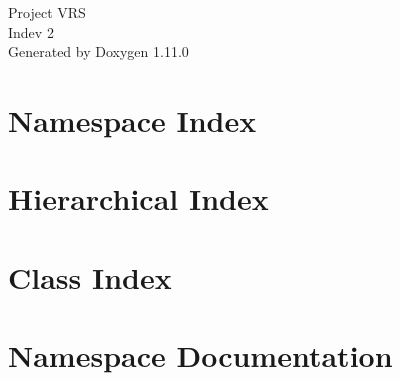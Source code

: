 \documentclass[twoside]{book}
\newcommand{\+}{\discretionary{\mbox{\scriptsize$\hookleftarrow$}}{}{}}
\newcommand{\clearemptydoublepage}{%
    \newpage{\pagestyle{empty}\cleardoublepage}%
  }
\begin{document}
  \raggedbottom
    \hypersetup{pageanchor=false,
                bookmarksnumbered=true,
                pdfencoding=unicode
               }
  \begin{titlepage}
  \vspace*{7cm}
  \begin{center}%
  {\Large Project VRS}\\
  [1ex]\large Indev 2 \\
  \vspace*{1cm}
  {\large Generated by Doxygen 1.11.0}\\
  \end{center}
  \end{titlepage}
  \clearemptydoublepage
  \tableofcontents
  \clearemptydoublepage
  \hypersetup{pageanchor=true}
\chapter{Namespace Index}

\chapter{Hierarchical Index}

\chapter{Class Index}

\chapter{Namespace Documentation}




\end{document}
